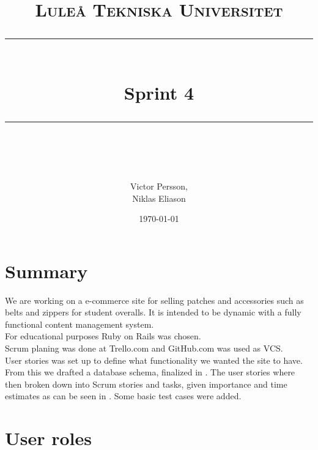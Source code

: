 \documentclass[paper=a4, fontsize=11pt]{report} %
\newcommand{\horrule}[1]{\rule{\linewidth}{#1}}       %
\begin{document}
%
\title{
	\normalfont \normalsize
	\textsc{Luleå Tekniska Universitet} \\ [25pt] %
	\horrule{1pt} \\[0.4cm]                       %
	\huge Sprint 4 \\                             %
	\horrule{1pt} \\[0.5cm]                       %
}
%
\author{Victor Persson,\\ Niklas Eliason}             %
%
\date{\normalsize\today}                              %
%
\maketitle                                            %
%
\tableofcontents
\thispagestyle{empty}
\sectionfont{\scshape}
%
\newpage
\setcounter{page}{1}


\section*{Summary}
	We are working on a e-commerce site for selling patches and accessories such as
	belts and zippers for student overalls. It is intended to be dynamic with a
	fully functional content management system. \\
	For educational purposes Ruby on Rails was chosen. \\
	Scrum planing was done at Trello.com and GitHub.com was used as VCS. \\

	User stories was set up
	 to define what functionality we wanted the site to have. From this we drafted a
	database schema, finalized in
	 . The user stories where then broken down into Scrum stories and tasks, given
	importance and time estimates as can be seen in
	 . Some basic test cases
	were added.


\section*{User roles}
\end{document}
